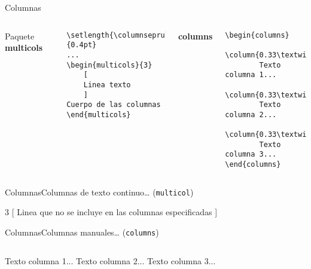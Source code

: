 \begin{frame}[fragile]{Columnas}
    \begin{columns}
        \hspace{1cm}
            Paquete \textbf{multicols}
            {\scriptsize
            \begin{verbatim}
\setlength{\columnseprule}{0.4pt}
...
\begin{multicols}{3}
    [
    Linea texto
    ]
Cuerpo de las columnas
\end{multicols}
            \end{verbatim}
            }

            \textbf{columns}
            {\scriptsize
            \begin{verbatim}
\begin{columns}
    \column{0.33\textwidth}
        Texto columna 1...
    \column{0.33\textwidth}
        Texto columna 2...
    \column{0.33\textwidth}
        Texto columna 3...
\end{columns}
            \end{verbatim}
            }
    \end{columns}
\end{frame}


\begin{frame}{Columnas}{Columnas de texto continuo\ldots{} (\texttt{multicol})}
    \begin{multicols}{3}
        [
        Linea que no se incluye en las columnas especificadas
        ]
        \blindtext
    \end{multicols}
\end{frame}


\begin{frame}[fragile]{Columnas}{Columnas manuales\ldots{} (\texttt{columns})}
    \begin{columns}
            Texto columna 1...
            Texto columna 2...
            Texto columna 3...
    \end{columns}
\end{frame}